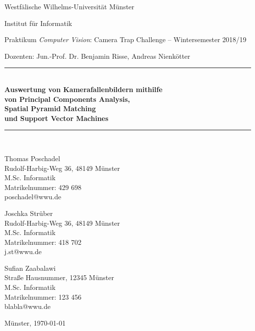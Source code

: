 \begin{titlepage}
	\newcommand{\HRule}{\rule{\linewidth}{0.8mm}}
	
	Westfälische Wilhelms-Universität Münster
	
	Institut für Informatik
	
	Praktikum \textit{Computer Vision}: Camera Trap Challenge -- Wintersemester 2018/19 
	
	Dozenten: Jun.-Prof. Dr. Benjamin Risse, Andreas Nienkötter

	\center
 
 	
	
	\HRule \\[0.5cm]
	{ \huge \sffamily\bfseries Auswertung von Kamerafallenbildern mithilfe \\ von Principal Components Analysis, \\ Spatial Pyramid Matching \\ und Support Vector Machines\\[0.4cm]}
	\HRule \\[0.5cm]
	
	
	\vfill
	\flushright
	
	Thomas Poschadel \\
	Rudolf-Harbig-Weg 36, 48149 Münster \\
	M.Sc. Informatik \\
	Matrikelnummer: 429 698 \\
	poschadel@wwu.de \\
	
	\vspace{2em}
	
	Joschka Strüber \\
	Rudolf-Harbig-Weg 36, 48149 Münster \\
	M.Sc. Informatik \\
	Matrikelnummer: 418 702 \\
	j.st@wwu.de \\
	
	\vspace{2em}
	
	Sufian Zaabalawi \\
	Straße Hausnummer, 12345 Münster \\
	M.Sc. Informatik \\
	Matrikelnummer: 123 456 \\
	blabla@wwu.de \\
	
	\vspace{2em}
	
	Münster, \today
	
	\restoregeometry
\end{titlepage}